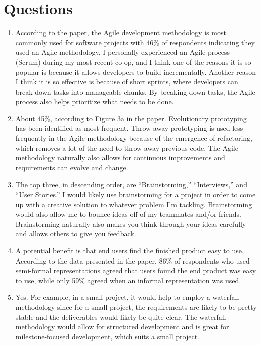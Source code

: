 \documentclass[12pt, letterpaper, titlepage]{article}
\begin{document}
\section{Questions}
\begin{enumerate}
    \item According to the paper, the Agile development methodology is most commonly used for software projects with 46\% of respondents indicating they used an Agile methodology. I personally experienced an Agile process (Scrum) during my most recent co-op, and I think one of the reasons it is so popular is because it allows developers to build incrementally. Another reason I think it is so effective is because of short sprints, where developers can break down tasks into manageable chunks. By breaking down tasks, the Agile process also helps prioritize what needs to be done.
    \item About 45\%, according to Figure 3a in the paper. Evolutionary prototyping has been identified as most frequent. Throw-away prototyping is used less frequently in the Agile methodology because of the emergence of refactoring, which removes a lot of the need to throw-away previous code. The Agile methodology naturally also allows for continuous improvements and requirements can evolve and change.
    \item The top three, in descending order, are ``Brainstorming,'' ``Interviews,'' and ``User Stories.'' I would likely use brainstorming for a project in order to come up with a creative solution to whatever problem I'm tackling. Brainstorming would also allow me to bounce ideas off of my teammates and/or friends. Brainstorming naturally also makes you think through your ideas carefully and allows others to give you feedback.
    \item A potential benefit is that end users find the finished product easy to use. According to the data presented in the paper, 86\% of respondents who used semi-formal representations agreed that users found the end product was easy to use, while only 59\% agreed when an informal representation was used.
    \item Yes. For example, in a small project, it would help to employ a waterfall methodology since for a small project, the requirements are likely to be pretty stable and the deliverables would likely be quite clear. The waterfall methodology would allow for structured development and is great for milestone-focused development, which suits a small project.
\end{enumerate}
    
\end{document}
